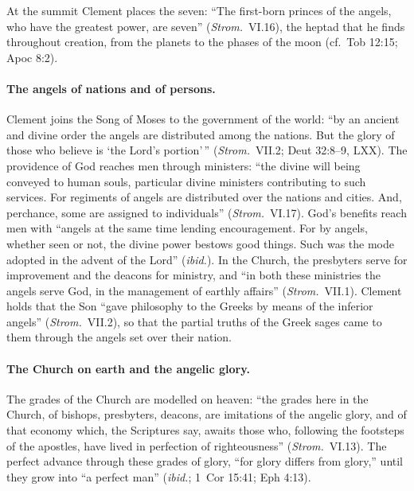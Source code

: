 At the summit Clement places the seven: ``The first-born princes of the
angels, who have the greatest power, are seven'' (\emph{Strom.}\ VI.16),
the heptad that he finds throughout creation, from the planets to the
phases of the moon (cf.\ Tob 12:15; Apoc 8:2).

\paragraph{The angels of nations and of persons.} Clement joins the Song of
Moses to the government of the world: ``by an ancient and divine order the
angels are distributed among the nations. But the glory of those who
believe is `the Lord's portion'\,'' (\emph{Strom.}\ VII.2; Deut 32:8--9,
LXX). The providence of God reaches men through ministers: ``the divine
will being conveyed to human souls, particular divine ministers
contributing to such services. For regiments of angels are distributed
over the nations and cities. And, perchance, some are assigned to
individuals'' (\emph{Strom.}\ VI.17). God's benefits reach men with ``angels at
the same time lending encouragement. For by angels, whether seen or not,
the divine power bestows good things. Such was the mode adopted in the
advent of the Lord'' (\emph{ibid.}). In the Church, the presbyters serve
for improvement and the deacons for ministry, and ``in both these
ministries the angels serve God, in the management of earthly affairs''
(\emph{Strom.}\ VII.1). Clement holds that the Son ``gave philosophy to the
Greeks by means of the inferior angels'' (\emph{Strom.}\ VII.2), so that
the partial truths of the Greek sages came to them through the angels set
over their nation.

\paragraph{The Church on earth and the angelic glory.} The grades of the
Church are modelled on heaven: ``the grades here in the Church, of
bishops, presbyters, deacons, are imitations of the angelic glory, and of
that economy which, the Scriptures say, awaits those who, following the
footsteps of the apostles, have lived in perfection of righteousness''
(\emph{Strom.}\ VI.13). The perfect advance through these grades of glory,
``for glory differs from glory,'' until they grow into ``a perfect man''
(\emph{ibid.}; 1~Cor 15:41; Eph 4:13).

